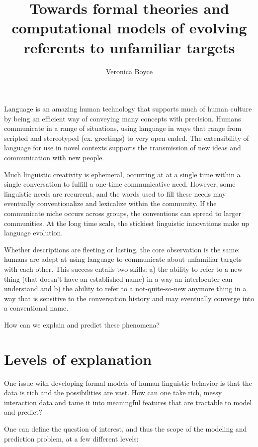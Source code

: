 \documentclass[]{article}
\title{Towards formal theories and computational models of evolving referents to unfamiliar targets}
\author{Veronica Boyce}
\begin{document}
	
	\maketitle
	
	
	
	
	
	
	Language is an amazing human technology that supports much of human culture by being an efficient way of conveying many concepts with precision. Humans communicate in a range of situations, using language in ways that range from scripted and stereotyped (ex. greetings) to very open ended. The extensibility of language for use in novel contexts supports the transmission of new ideas and communication with new people. 
	
	Much linguistic creativity is ephemeral, occurring at at a single time within a single conversation to fulfill a one-time communicative need.  However, some linguistic needs are recurrent, and the words used to fill these needs may eventually conventionalize and lexicalize within the community. If the communicate niche occurs across groups, the conventions can spread to larger communities.  At the long time scale, the stickiest linguistic innovations make up language evolution. 
	
	Whether descriptions are fleeting or lasting, the core observation is the same: humans are adept at using language to communicate about unfamiliar targets with each other. This success entails two skills: a) the ability to refer to a new thing (that doesn't have an established name) in a way an interlocuter can understand and b) the ability to refer to a not-quite-so-new anymore thing in a way that is sensitive to the conversation history and may eventually converge into a conventional name. 
	
	How can we explain and predict these phenomena?
	
	\section{Levels of explanation}
	One issue with developing formal models of human linguistic behavior is that the data is rich and the possibilities are vast. How can one take rich, messy interaction data and tame it into meaningful features that are tractable to model and predict? 
	
	One can define the question of interest, and thus the scope of the modeling and prediction problem, at a few different levels:
	
\end{document}

